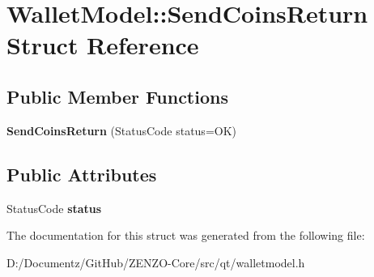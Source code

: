 \hypertarget{struct_wallet_model_1_1_send_coins_return}{}\section{Wallet\+Model\+::Send\+Coins\+Return Struct Reference}
\label{struct_wallet_model_1_1_send_coins_return}
\subsection*{Public Member Functions}
\begin{DoxyCompactItemize}
\item 
\mbox{\label{struct_wallet_model_1_1_send_coins_return_a90535f802fe84b050ad71db600b11fd7}} 
{\bfseries Send\+Coins\+Return} (Status\+Code status=OK)
\end{DoxyCompactItemize}
\subsection*{Public Attributes}
\begin{DoxyCompactItemize}
\item 
\mbox{\label{struct_wallet_model_1_1_send_coins_return_af7d485f3ae8e2baef7439c53c2adbd35}} 
Status\+Code {\bfseries status}
\end{DoxyCompactItemize}


The documentation for this struct was generated from the following file\+:\begin{DoxyCompactItemize}
\item 
D\+:/\+Documentz/\+Git\+Hub/\+Z\+E\+N\+Z\+O-\/\+Core/src/qt/walletmodel.\+h\end{DoxyCompactItemize}
